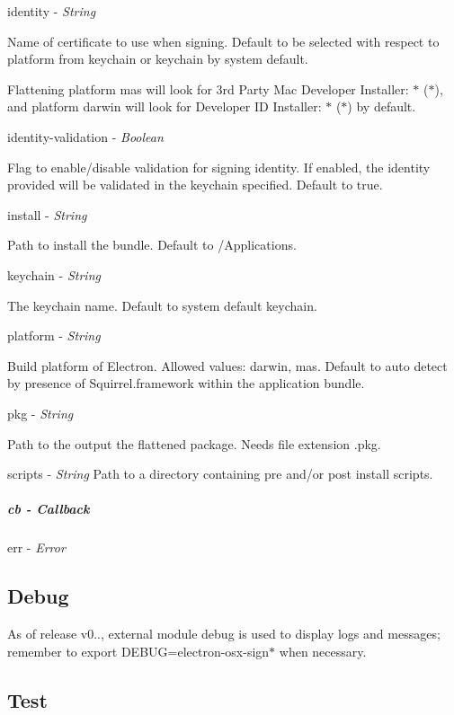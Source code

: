 {\ttfamily identity} -\/ {\itshape String}

Name of certificate to use when signing. Default to be selected with respect to {\ttfamily platform} from {\ttfamily keychain} or keychain by system default.

Flattening platform {\ttfamily mas} will look for {\ttfamily 3rd Party Mac Developer Installer\+: $\ast$ ($\ast$)}, and platform {\ttfamily darwin} will look for {\ttfamily Developer ID Installer\+: $\ast$ ($\ast$)} by default.

{\ttfamily identity-\/validation} -\/ {\itshape Boolean}

Flag to enable/disable validation for signing identity. If enabled, the {\ttfamily identity} provided will be validated in the {\ttfamily keychain} specified. Default to {\ttfamily true}.

{\ttfamily install} -\/ {\itshape String}

Path to install the bundle. Default to {\ttfamily /\+Applications}.

{\ttfamily keychain} -\/ {\itshape String}

The keychain name. Default to system default keychain.

{\ttfamily platform} -\/ {\itshape String}

Build platform of Electron. Allowed values\+: {\ttfamily darwin}, {\ttfamily mas}. Default to auto detect by presence of {\ttfamily Squirrel.\+framework} within the application bundle.

{\ttfamily pkg} -\/ {\itshape String}

Path to the output the flattened package. Needs file extension {\ttfamily .pkg}.

{\ttfamily scripts} -\/ {\itshape String} Path to a directory containing pre and/or post install scripts.

\subparagraph*{cb -\/ Callback}

{\ttfamily err} -\/ {\itshape Error}

\subsection*{Debug}

As of release v0.., external module {\ttfamily debug} is used to display logs and messages; remember to {\ttfamily export D\+E\+B\+UG=electron-\/osx-\/sign$\ast$} when necessary.

\subsection*{Test}

